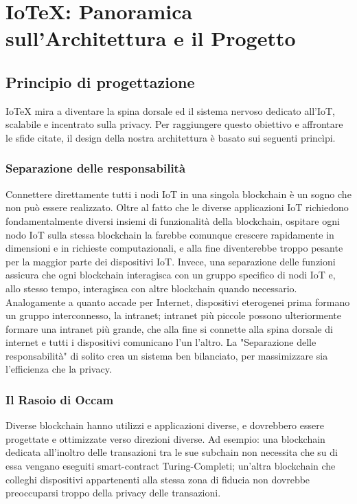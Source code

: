 \section{IoTeX: Panoramica sull'Architettura e il Progetto}

\subsection{Principio di progettazione}
IoTeX mira a diventare la spina dorsale ed il sistema nervoso dedicato all'IoT, scalabile e incentrato sulla privacy. Per raggiungere questo obiettivo e affrontare le sfide citate, il design della nostra architettura è basato sui seguenti princìpi.

\subsubsection{Separazione delle responsabilità}
Connettere direttamente tutti i nodi IoT in una singola blockchain è un sogno che non può essere realizzato. Oltre al fatto che le diverse applicazioni IoT richiedono fondamentalmente diversi insiemi di funzionalità della blockchain, ospitare ogni nodo IoT sulla stessa blockchain la farebbe comunque crescere rapidamente in dimensioni e in richieste computazionali, e alla fine diventerebbe troppo pesante per la maggior parte dei dispositivi IoT. Invece, una separazione delle funzioni assicura che ogni blockchain interagisca con un gruppo specifico di nodi IoT e, allo stesso tempo, interagisca con altre blockchain quando necessario. Analogamente a quanto accade per Internet, dispositivi eterogenei prima formano un gruppo interconnesso, la intranet; intranet più piccole possono ulteriormente formare una intranet più grande, che alla fine si connette alla spina dorsale di internet e tutti i dispositivi comunicano l'un l'altro.
La "Separazione delle responsabilità" di solito crea un sistema ben bilanciato, per massimizzare sia l'efficienza che la privacy.

\subsubsection{Il Rasoio di Occam}
Diverse blockchain hanno utilizzi e applicazioni diverse, e dovrebbero essere progettate e ottimizzate verso direzioni diverse. Ad esempio: una blockchain dedicata all'inoltro delle transazioni tra le sue subchain non necessita che su di essa vengano eseguiti smart-contract Turing-Completi; un'altra blockchain che colleghi dispositivi appartenenti alla stessa zona di fiducia non dovrebbe preoccuparsi troppo della privacy delle transazioni.

